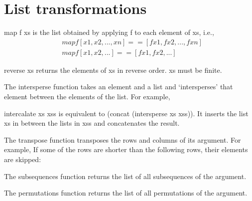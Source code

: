 \section{List transformations}

map f xs is the list obtained by applying f to each element of xs, i.e.,
\begin{align*}
	&map f [x1, x2, ..., xn] == [f x1, f x2, ..., f xn]\\
	&map f [x1, x2, ...] == [f x1, f x2, ...]
\end{align*}

reverse xs returns the elements of xs in reverse order. xs must be finite.

The intersperse function takes an element and a list and `intersperses' that element between the elements of the list. For example,

intercalate xs xss is equivalent to (concat (intersperse xs xss)). It inserts the list xs in between the lists in xss and concatenates the result.

The transpose function transposes the rows and columns of its argument. For example,
If some of the rows are shorter than the following rows, their elements are skipped:

The subsequences function returns the list of all subsequences of the argument.

The permutations function returns the list of all permutations of the argument.
